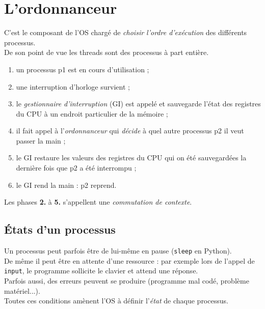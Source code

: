 \documentclass[10pt,firamath,cours]{nsi}
\begin{document}
\section{L'ordonnanceur}


C'est le composant de l'OS chargé de \textit{choisir l'ordre d'exécution} des différents processus.\\
De son point de vue les threads sont des processus à part entière.

\begin{exemple}[ de fonctionnement]
    \begin{enumerate}
        \item un processus p1 est en cours d'utilisation ;
        \item une interruption d'horloge survient ;
        \item le \textit{gestionnaire d'interruption} (GI) est appelé et sauvegarde l'état des registres du CPU à un endroit particulier de la mémoire ;
        \item il fait appel à l'\textit{ordonnanceur} qui \textit{décide} à quel autre processus p2  il veut passer la main ;
        \item le GI restaure les valeurs des registres du CPU qui on été sauvegardées la dernière fois que p2 a été interrompu ;
        \item le GI rend la main : p2 reprend.
    \end{enumerate}
    Les phases \textbf{2.} à \textbf{5.} s'appellent une \textit{commutation de contexte}.        
\end{exemple}

\subsection{\'Etats d'un processus}
Un processus peut parfois être de lui-même en pause (\texttt{sleep} en Python).\\
De même il peut être en attente d'une ressource : par exemple lors de l'appel de \texttt{input}, le programme sollicite le clavier et attend une réponse.\\
Parfois aussi, des erreurs peuvent se produire (programme mal codé, problème matériel...).\\

Toutes ces conditions amènent l'OS à définir l'\textit{état} de chaque processus.
\end{document}
